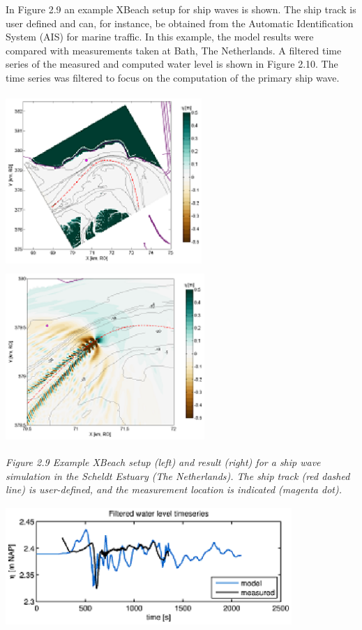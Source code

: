 \documentclass{article}
\begin{document}
\noindent 

\noindent In Figure 2.9 an example XBeach setup for ship waves is shown. The ship track is user defined and can, for instance, be obtained from the Automatic Identification System (AIS) for marine traffic. In this example, the model results were compared with measurements taken at Bath, The Netherlands. A filtered time series of the measured and computed water level is shown in Figure 2.10. The time series was filtered to focus on the computation of the primary ship wave.

\noindent 

\noindent \includegraphics*[width=2.93in, height=2.58in, keepaspectratio=false, trim=0.48in 0.00in 0.27in 0.18in]{image20} \includegraphics*[width=2.97in, height=2.57in, keepaspectratio=false, trim=0.44in 0.01in 0.28in 0.18in]{image21}

\noindent \textit{Figure 2.9 Example XBeach setup (left) and result (right) for a ship wave simulation in the Scheldt Estuary (The Netherlands). The ship track (red dashed line) is user-defined, and the measurement location is indicated (magenta dot).}

\noindent 

\noindent \includegraphics*[width=4.27in, height=1.78in, keepaspectratio=false]{image22}
\end{document}
